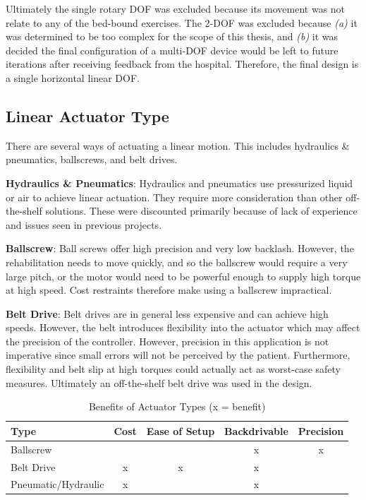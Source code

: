 \documentclass[12pt]{report}
\begin{document}
		Ultimately the single rotary DOF was excluded because its movement was not relate to any of the bed-bound exercises. The 2-DOF was excluded because \textit{(a)} it was determined to be too complex for the scope of this thesis, and \textit{(b)} it was decided the final configuration of a multi-DOF device would be left to future iterations after receiving feedback from the hospital. Therefore, the final design is a single horizontal linear DOF. 

					
		\subsection{Linear Actuator Type}

	There are several ways of actuating a linear motion. This includes hydraulics \& pneumatics, ballscrews, and belt drives.
	
	\textbf{Hydraulics \& Pneumatics}: Hydraulics and pneumatics use pressurized liquid or air to achieve linear actuation. They require more consideration than other off-the-shelf solutions. These were discounted primarily because of lack of experience and issues seen in previous projects. 

	\textbf{Ballscrew}: Ball screws offer high precision and very low backlash. However, the rehabilitation needs to move quickly, and so the ballscrew would require a very large pitch, or the motor would need to be powerful enough to supply high torque at high speed. Cost restraints therefore make using a ballscrew impractical. 
	
	\textbf{Belt Drive}: Belt drives are in general less expensive and can achieve high speeds. However, the belt introduces flexibility into the actuator which may affect the precision of the controller. However, precision in this application is not imperative since small errors will not be perceived by the patient. Furthermore, flexibility and belt slip at high torques could actually act as worst-case safety measures. Ultimately an off-the-shelf belt drive was used in the design.


	
	\begin{table}[]
	\centering
	\caption{Benefits of Actuator Types (x = benefit)}	
	\begin{tabular}{|l|c|c|c|c|}
		\hline
		\textbf{Type} & \textbf{Cost} & \textbf{Ease of Setup} & 		\textbf{Backdrivable} & \textbf{Precision} \\ \hline
		Ballscrew &  &  & x & x \\ \hline
		Belt Drive & x & x & x & \\ \hline
		Pneumatic/Hydraulic & x &  & x & \\ \hline
		\end{tabular}
	\label{tab:actuator}
	\end{table}
				
\end{document}
